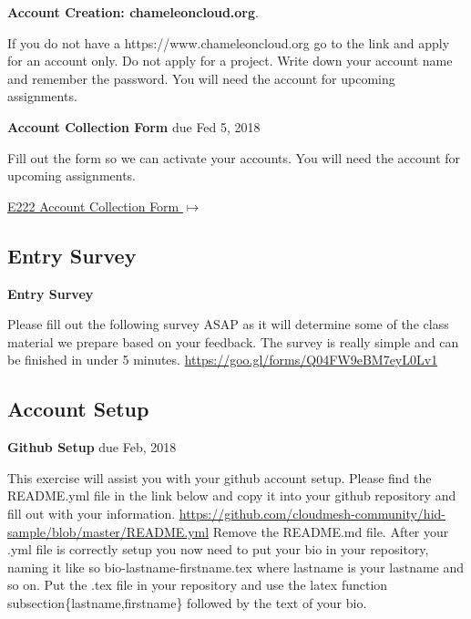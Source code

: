\begin{exercise}
  {\bf Account Creation: chameleoncloud.org}. 
  
  If you do not have a
  https://www.chameleoncloud.org go to the link and apply for an
  account only. Do not apply for a project. Write down your account
  name and remember the password. You will need the account for
  upcoming assignments.
\end{exercise}

\begin{exercise}
   {\bf Account Collection Form } due Fed 5, 2018
 
 Fill out the form so we can activate your accounts. You will need the account for upcoming assignments.
 
  {\hfill \href{https://goo.gl/forms/W0MdgoJoY8F6Vt9Q2}{E222 Account Collection Form $\mapsto$}}
 
\end{exercise}

\subsection{Entry Survey}
\begin{exercise}
    {\bf Entry Survey}
    
 Please fill out the following survey ASAP as it will determine some of the class material we prepare based on your feedback. The survey is really simple and can be finished in under 5 minutes. \url{https://goo.gl/forms/Q04FW9eBM7eyL0Lv1}
\end{exercise}

\subsection{Account Setup}

\begin{exercise} {\bf Github Setup} due Feb, 2018

This exercise will assist you with your github account setup. Please find the README.yml file in the link below and copy it into your github repository and fill out with your information. \url{https://github.com/cloudmesh-community/hid-sample/blob/master/README.yml} Remove the README.md file. After your .yml file is correctly setup you now need to put your bio in your repository, naming it like so bio-lastname-firstname.tex where lastname is your lastname and so on. Put the .tex file in your repository and use the latex function subsection\{lastname,firstname\} followed by the text of your bio.

\end{exercise}

